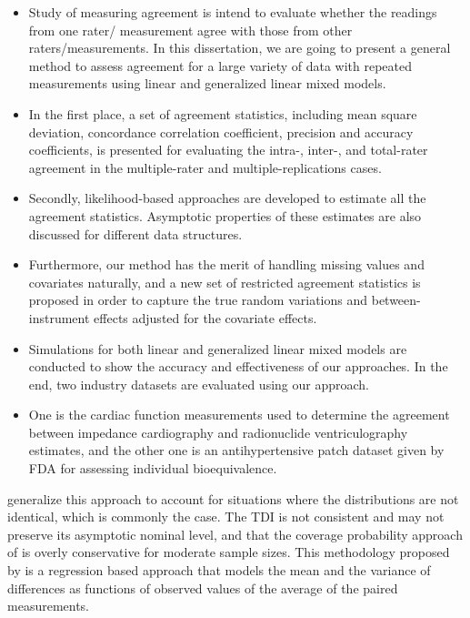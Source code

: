 \documentclass[12pt, a4paper]{report}
\theoremstyle{plain}
\theoremstyle{definition}
\theoremstyle{remark}
\begin{document}
	\begin{itemize}
		\item Study of measuring agreement is intend to evaluate whether the readings from one rater/ measurement 
		agree with those from other raters/measurements. 
		In this dissertation, we are going to present a general method to assess agreement for a large 
		variety of data with repeated measurements using linear and generalized linear mixed models. 
		\item In the first place, a set of agreement statistics, including mean square deviation, concordance 
		correlation coefficient, precision and accuracy coefficients, is presented for evaluating the 
		intra-, inter-, and total-rater agreement in the multiple-rater and multiple-replications cases. 
		\item Secondly, likelihood-based approaches are developed to estimate all the agreement statistics. 
		Asymptotic properties of these estimates are also discussed for different data structures. 
		\item Furthermore, our method has the merit of handling missing values and covariates naturally, 
		and a new set of restricted agreement statistics is proposed in order to capture the true random 
		variations and between-instrument effects adjusted for the covariate effects. 
		
		\item Simulations for both linear and generalized linear mixed models are conducted to show the accuracy and effectiveness 
		of our approaches. In the end, two industry datasets are evaluated using our approach. 
		\item One is the cardiac function measurements used to determine the agreement between impedance cardiography and radionuclide 
		ventriculography estimates, and the other one is an antihypertensive patch dataset given by FDA for assessing 
		individual bioequivalence.
	\end{itemize}

\newpage






\citet{pkcng} generalize this approach to account for situations
where the distributions are not identical, which is commonly the
case. The TDI is not consistent and may not preserve its
asymptotic nominal level, and that the coverage probability
approach of \citet{lin2002} is overly conservative for moderate
sample sizes. This methodology proposed by \citet{pkcng} is a
regression based approach that models the mean and the variance of
differences as functions of observed values of the average of the
paired measurements.
\end{document}

